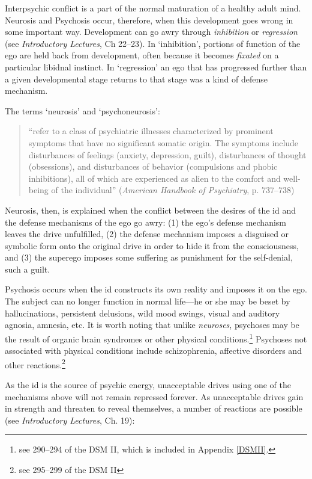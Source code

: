 \begin{refsection}
Interpsychic conflict is a part of the normal maturation of a healthy adult mind. Neurosis and Psychosis occur, therefore, when this development goes wrong in some important way. Development can go awry through \emph{inhibition} or \emph{regression} (see \emph{Introductory Lectures}, Ch 22--23). In `inhibition', portions of function of the ego are held back from development, often because it becomes \emph{fixated} on a particular libidnal instinct. In `regression' an ego that has progressed further than a given developmental stage returns to that stage was a kind of defense mechanism.

The terms `neurosis' and `psychoneurosis':

\begin{quote}

``refer to a class of psychiatric illnesses characterized by prominent symptoms that have no significant somatic origin. The symptoms include disturbances of feelings (anxiety, depression, guilt), disturbances of thought (obsessions), and disturbances of behavior (compulsions and phobic inhibitions), all of which are experienced as alien to the comfort and well-being of the individual'' (\emph{American Handbook of Psychiatry}, p. 737--738)
\end{quote}

Neurosis, then, is explained when the conflict between the desires of the id and the defense mechanisms of the ego go awry: (1) the ego's defense mechanism leaves the drive unfulfilled, (2) the defense mechanism imposes a disguised or symbolic form onto the original drive in order to hide it from the consciousness, and (3) the superego imposes some suffering as punishment for the self-denial, such a guilt.

Psychosis occurs when the id constructs its own reality and imposes it on the ego. The subject can no longer function in normal life---he or she may be beset by hallucinations, persistent delusions, wild mood swings, visual and auditory agnosia, amnesia, etc. It is worth noting that unlike \emph{neuroses}, psychoses may be the result of organic brain syndromes or other physical conditions.\footnote{see 290--294 of the DSM II, which is included in Appendix \ref{DSMII}.} Psychoses not associated with physical conditions include schizophrenia, affective disorders and other reactions.\footnote{see 295--299 of the DSM II}

As the id is the source of psychic energy, unacceptable drives using one of the mechanisms above will not remain repressed forever. As unacceptable drives gain in strength and threaten to reveal themselves, a number of reactions are possible (see \emph{Introductory Lectures}, Ch. 19):


\end{refsection}
